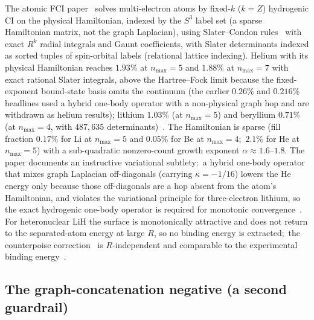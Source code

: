 \documentclass[aps,pra,twocolumn,superscriptaddress,longbibliography]{revtex4-2}
\begin{document}
The atomic FCI paper~\cite{loutey_fci_atoms} solves multi-electron
atoms by fixed-$k$ ($k = Z$) hydrogenic CI on the physical Hamiltonian,
indexed by the $S^3$ label set (a sparse Hamiltonian matrix, not the
graph Laplacian), using
Slater--Condon rules~\cite{Slater1960, CondonShortley1935} with exact $R^k$ radial integrals and Gaunt
coefficients, with Slater determinants indexed as sorted tuples of
spin-orbital labels (relational lattice indexing).  Helium with its
physical Hamiltonian reaches $1.93\%$ at $n_{\max}=5$ and $1.88\%$ at
$n_{\max}=7$ with exact rational Slater integrals, above the
Hartree--Fock limit because the fixed-exponent bound-state basis omits
the continuum (the earlier $0.26\%$ and $0.216\%$ headlines used a
hybrid one-body operator with a non-physical graph hop and are
withdrawn as helium results); lithium $1.03\%$ (at $n_{\max}=5$)
and beryllium $0.71\%$ (at $n_{\max}=4$, with $487{,}635$
determinants)~\cite{loutey_fci_atoms}.  The Hamiltonian is sparse
(fill fraction $0.17\%$ for Li at $n_{\max}=5$ and $0.05\%$ for Be at
$n_{\max}=4$;\ $2.1\%$ for He at $n_{\max}=5$) with a sub-quadratic
nonzero-count growth exponent $\alpha \approx 1.6$--$1.8$.  The paper documents an instructive
variational subtlety:\ a hybrid one-body operator that mixes graph
Laplacian off-diagonals (carrying $\kappa = -1/16$) lowers the He
energy only because those off-diagonals are a hop absent from the
atom's Hamiltonian, and violates the variational principle for
three-electron lithium, so the
exact hydrogenic one-body operator is required for monotonic
convergence~\cite{loutey_fci_atoms}.  For heteronuclear LiH the
surface is monotonically attractive and does not return to the
separated-atom energy at large $R$, so no binding energy is extracted;\
the counterpoise correction~\cite{boys_bernardi} is $R$-independent and
comparable to the experimental binding energy~\cite{loutey_fci_atoms}.

\subsection{The graph-concatenation negative (a second guardrail)}
\end{document}
